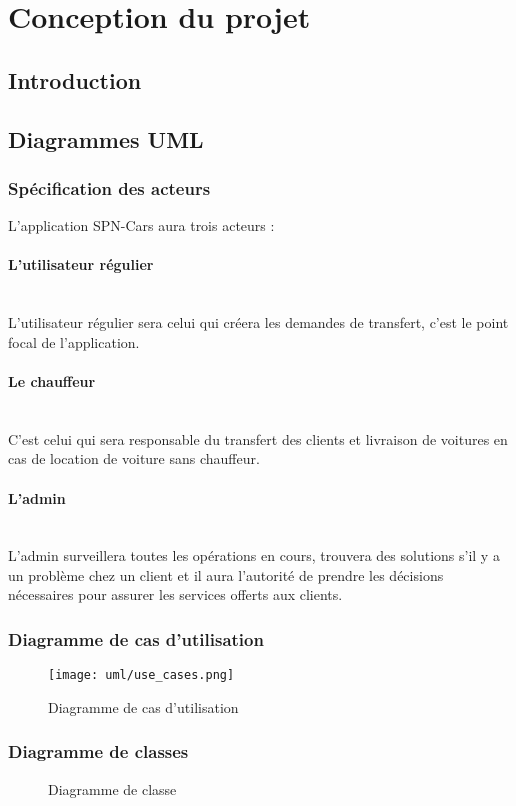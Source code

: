 \section{Conception du projet}
\subsection{Introduction}
\subsection{Diagrammes UML}
\subsubsection{Spécification des acteurs}
L'application SPN-Cars aura trois acteurs :
\paragraph{L'utilisateur régulier}\mbox{} \\
L'utilisateur régulier sera celui qui créera les demandes de transfert, c'est le point focal de l'application.
\paragraph{Le chauffeur}\mbox{} \\
C'est celui qui sera responsable du transfert des clients et livraison de voitures en cas de location de voiture sans chauffeur.
\paragraph{L'admin}\mbox{} \\
L'admin surveillera toutes les opérations en cours, trouvera des solutions s'il y a un problème chez un client et il aura l'autorité de prendre les décisions nécessaires pour assurer les services offerts aux clients.
\subsubsection{Diagramme de cas d'utilisation}
\begin{figure}[H]
    \centering
    \texttt{[image: uml/use\_cases.png]}
    \vspace{1cm}
    \caption{Diagramme de cas d'utilisation}
    \label{fig:use_case_diag}
\end{figure}

\subsubsection{Diagramme de classes}
\begin{figure}[H]
    \centering
    \vspace{1cm}
    \caption{Diagramme de classe}
    \label{fig:class_diag}
\end{figure}

